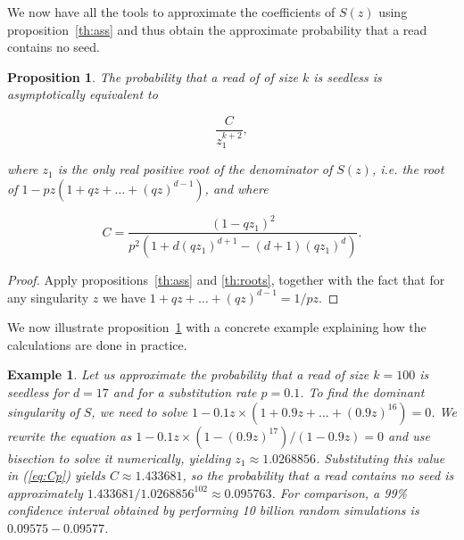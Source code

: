 \documentclass{article}
\newtheorem{example}{Example}
\newtheorem{proposition}{Proposition}
\begin{document}
We now have all the tools to approximate the coefficients of $S(z)$ using
proposition~\ref{th:ass} and thus obtain the approximate probability that
a read contains no seed.

\begin{proposition}
\label{th:p}
The probability that a read of of size $k$ is seedless is
asymptotically equivalent to

\begin{equation*}
\frac{C}{z_1^{k+2}},
\end{equation*}

\noindent
where $z_1$ is the only real positive root of the denominator of $S(z)$,
\textit{i.e.} the root of $1-pz(1+qz+\ldots+(qz)^{d-1})$, and where

\begin{equation}
\label{eq:Cp}
C =\frac{(1-qz_1)^2}{p^2\left( 1 + d(qz_1)^{d+1} - (d+1)(qz_1)^d
\right)}.
\end{equation}
\end{proposition}

\begin{proof}
Apply propositions~\ref{th:ass} and \ref{th:roots}, together with the fact
that for any singularity $z$ we have $1+qz+\ldots+(qz)^{d-1} = 1/pz$.
\end{proof}

We now illustrate proposition~\ref{th:p} with a concrete example
explaining how the calculations are done in practice.

\begin{example}
\label{ex:num1}
Let us approximate the probability that a read of size $k=100$ is seedless
for $d=17$ and for a substitution rate $p=0.1$. To find the dominant
singularity of $S$, we need to solve
$1-0.1z\times(1+0.9z+\ldots+(0.9z)^{16}) = 0$.  We rewrite the equation as
$1 - 0.1z\times(1-(0.9 z)^{17})/(1-0.9z) = 0$ and use bisection to solve
it numerically, yielding $z_1 \approx 1.0268856$. Substituting this value
in (\ref{eq:Cp}) yields $C \approx 1.433681$, so the probability that a
read contains no seed is approximately $1.433681 / 1.0268856^{102} \approx
0.095763$. For comparison, a 99\% confidence interval obtained by
performing 10 billion random simulations is $0.09575-0.09577$.
\end{example}
\end{document}
